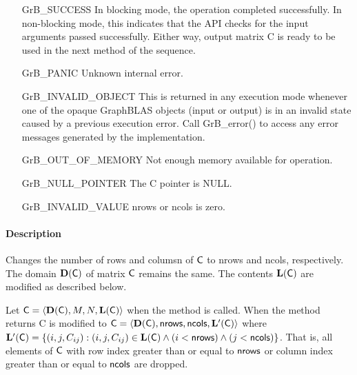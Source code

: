 \begin{itemize}[leftmargin=2.1in]
    \item[{\sf GrB\_SUCCESS}]         In blocking mode, the operation completed
    successfully. In non-blocking mode, this indicates that the API checks 
    for the input arguments passed successfully. Either way, output matrix 
    {\sf C} is ready to be used in the next method of the sequence.

    \item[{\sf GrB\_PANIC}]           Unknown internal error.
    
    \item[{\sf GrB\_INVALID\_OBJECT}] This is returned in any execution mode 
    whenever one of the opaque GraphBLAS objects (input or output) is in an invalid 
    state caused by a previous execution error.  Call {\sf GrB\_error()} to access 
    any error messages generated by the implementation.

    \item[{\sf GrB\_OUT\_OF\_MEMORY}] Not enough memory available for operation.
    
    \item[{\sf GrB\_NULL\_POINTER}]  The {\sf C} pointer is {\sf NULL}.
    
    \item[{\sf GrB\_INVALID\_VALUE}] {\sf nrows} or {\sf ncols} is zero.
\end{itemize}

\paragraph{Description}

Changes the number of rows and columsn of ${\sf C}$ to {\sf nrows} and {\sf ncols}, respectively. The domain
$\mathbf{D}({\sf C})$ of matrix ${\sf C}$ remains the same. The
contents $\mathbf{L}({\sf C})$ are modified as described below.

Let ${\sf C} = \langle \mathbf{D}({\sf C}), M, N, \mathbf{L}({\sf C})
\rangle$ when the method is called. When the method returns {\sf C} is modified to ${\sf C}
= \langle \mathbf{D}({\sf C}), {\sf nrows}, {\sf ncols}, \mathbf{L'}({\sf C})
\rangle$ where $\mathbf{L'}({\sf C}) = \{(i,j,C_{ij}) : (i,j,C_{ij}) \in
\mathbf{L}({\sf C}) \wedge (i < {\sf nrows}) \wedge (j < {\sf ncols})\}$. That is, all elements
of ${\sf C}$ with row index greater than or equal to 
${\sf nrows}$ or column index greater than or equal to ${\sf ncols}$ are dropped.


